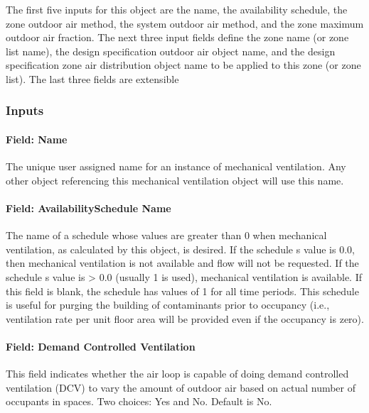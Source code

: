 The first five inputs for this object are the name, the availability schedule, the zone outdoor air method, the system outdoor air method, and the zone maximum outdoor air fraction. The next three input fields define the zone name (or zone list name), the design specification outdoor air object name, and the design specification zone air distribution object name to be applied to this zone (or zone list). The last three fields are extensible

\subsubsection{Inputs}\label{inputs-2-007}

\paragraph{Field: Name}\label{field-name-2-006}

The unique user assigned name for an instance of mechanical ventilation. Any other object referencing this mechanical ventilation object will use this name.

\paragraph{Field: AvailabilitySchedule Name}\label{field-availabilityschedule-name}

The name of a schedule whose values are greater than 0 when mechanical ventilation, as calculated by this object, is desired. If the schedule s value is 0.0, then mechanical ventilation is not available and flow will not be requested. If the schedule s value is \textgreater{} 0.0 (usually 1 is used), mechanical ventilation is available. If this field is blank, the schedule has values of 1 for all time periods. This schedule is useful for purging the building of contaminants prior to occupancy (i.e., ventilation rate per unit floor area will be provided even if the occupancy is zero).

\paragraph{Field: Demand Controlled Ventilation}\label{field-demand-controlled-ventilation}

This field indicates whether the air loop is capable of doing demand controlled ventilation (DCV) to vary the amount of outdoor air based on actual number of occupants in spaces. Two choices: Yes and No. Default is No.


